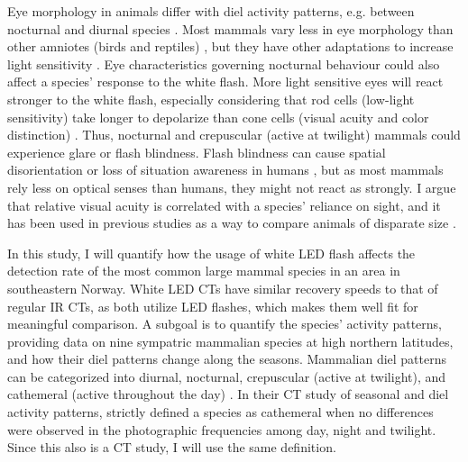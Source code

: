 Eye morphology in animals differ with diel activity patterns, e.g. between nocturnal and diurnal species \autocite{Schmitz2010}. 
Most mammals vary less in eye morphology than other amniotes (birds and reptiles) \autocite{Schmitz2010, Hall2012}, but they have other adaptations to increase light sensitivity \autocite{Ollivier2004,Solovei2009}. 
Eye characteristics governing nocturnal behaviour could also affect a species' response to the white flash. More light sensitive eyes will react stronger to the white flash, especially considering that rod cells (low-light sensitivity) take longer to depolarize than cone cells (visual acuity and color distinction) \autocite{Dryja2005}.
Thus, nocturnal and crepuscular (active at twilight) mammals could experience glare or flash blindness.
Flash blindness can cause spatial disorientation or loss of situation awareness in humans \autocite{Nakagawara2001}, but as most mammals rely less on optical senses than humans, they might not react as strongly.
I argue that relative visual acuity is correlated with a species' reliance on sight, and it has been used in previous studies as a way to compare animals of disparate size \autocite{Hall2012}. 



In this study, I will quantify how the usage of white LED flash affects the detection rate of the most common large mammal species in an area in southeastern Norway.
White LED CTs have similar recovery speeds to that of regular IR CTs, as both utilize LED flashes, which makes them well fit for meaningful comparison.
A subgoal is to quantify the species' activity patterns, providing data on nine sympatric mammalian species at high northern latitudes, and how their diel patterns change along the seasons.
Mammalian diel patterns can be categorized into diurnal, nocturnal, crepuscular (active at twilight), and cathemeral (active throughout the day) \autocite{Ikeda2016}.
In their CT study of seasonal and diel activity patterns, \textcite{Ikeda2016} strictly defined a species as cathemeral when no differences were observed in the photographic frequencies among day, night and twilight. Since this also is a CT study, I will use the same definition.

